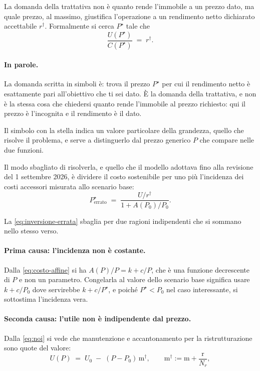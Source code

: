 \documentclass[11pt,a4paper]{article}
\theoremstyle{definition}
\theoremstyle{plain}
\begin{document}
La domanda della trattativa non è quanto rende l'immobile a un prezzo dato, ma quale prezzo, al massimo, giustifica l'operazione a un rendimento netto dichiarato accettabile $r^\dagger$. Formalmente si cerca $P^\star$ tale che
\begin{equation}
\frac{U(P^\star)}{C(P^\star)} \;=\; r^\dagger .
\label{eq:problema-inversione}
\end{equation}

\paragraph{In parole.} La domanda scritta in simboli è: trova il prezzo $P^\star$ per cui il rendimento netto è esattamente pari all'obiettivo che ti sei dato. È la domanda della trattativa, e non è la stessa cosa che chiedersi quanto rende l'immobile al prezzo richiesto: qui il prezzo è l'incognita e il rendimento è il dato.

Il simbolo con la stella indica un valore particolare della grandezza, quello che risolve il problema, e serve a distinguerlo dal prezzo generico $P$ che compare nelle due funzioni.

Il modo sbagliato di risolverla, e quello che il modello adottava fino alla revisione del 1 settembre 2026, è dividere il costo sostenibile per uno più l'incidenza dei costi accessori misurata allo scenario base:
\begin{equation}
P^\star_{\text{errato}} \;=\; \frac{U/r^\dagger}{1 + A(P_0)/P_0}.
\label{eq:inversione-errata}
\end{equation}

La \eqref{eq:inversione-errata} sbaglia per due ragioni indipendenti che si sommano nello stesso verso.

\paragraph{Prima causa: l'incidenza non è costante.} Dalla \eqref{eq:costo-affine} si ha $A(P)/P = k + c/P$, che è una funzione decrescente di $P$ e non un parametro. Congelarla al valore dello scenario base significa usare $k + c/P_0$ dove servirebbe $k + c/P^\star$, e poiché $P^\star < P_0$ nel caso interessante, si sottostima l'incidenza vera.

\paragraph{Seconda causa: l'utile non è indipendente dal prezzo.} Dalla \eqref{eq:noi} si vede che manutenzione e accantonamento per la ristrutturazione sono quote del valore:
\begin{equation}
U(P) \;=\; U_0 \;-\; (P-P_0)\,\mathrm{m}^\dagger,
\qquad
\mathrm{m}^\dagger := \mathrm{m} + \frac{\mathrm{r}}{N_r},
\label{eq:utile-di-p}
\end{equation}
\end{document}
